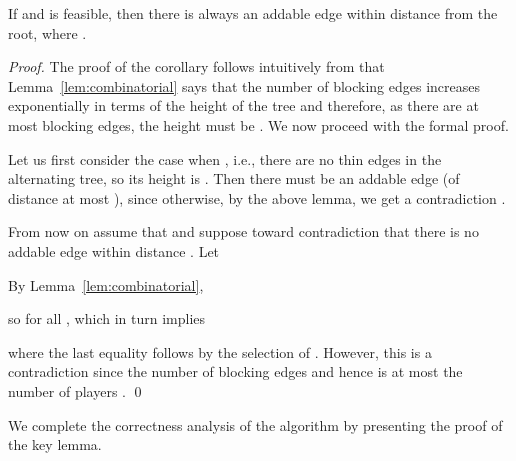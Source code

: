 \documentclass{llncs}
\begin{document}
\begin{corollary}
  \label{cor:height}
  If  and  is feasible, then there is always an addable edge
  within distance  from the root, where .
\end{corollary}
\begin{proof}
The proof of the corollary follows intuitively from that Lemma~\ref{lem:combinatorial} says that
the number of blocking edges increases  exponentially in terms of the height of the tree and
therefore, as there are at most  blocking edges, the height must be . We now proceed with the formal proof.

Let us first consider the case when , i.e., there are no
thin edges in the alternating tree, so its height is . Then there must be an
addable edge (of distance at most ), since otherwise, by the above lemma, we
get a contradiction .

From now on assume that  and suppose toward contradiction that
there is no addable edge within distance . Let

By Lemma~\ref{lem:combinatorial},

so  for all , which in turn implies

where the last equality follows by the selection of .  However, this is a
contradiction since the number of blocking edges and hence  is at
most the number of players .
\qed

\end{proof}
We complete the correctness analysis of the algorithm by presenting the  proof of the key lemma.
\end{document}
